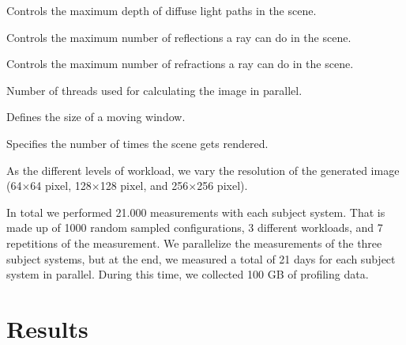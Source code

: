 
\begin{description}[style=multiline,leftmargin=11em]
	\item [DiffuseDepth] Controls the maximum depth of diffuse light paths in the scene. 
	\item [ReflectionDepth] Controls the maximum number of reflections a ray can do in the scene.
	\item [RefractionDepth] Controls the maximum number of refractions a ray can do in the scene.
	\item [Threads] Number of threads used for calculating the image in parallel.
	\item [BucketSize] Defines the size of a moving window.
	\item [Samples] Specifies the number of times the scene gets rendered.
\end{description}

As the different levels of workload, we vary the resolution of the generated image (64$\times$64 pixel, 128$\times$128 pixel, and 256$\times$256 pixel).


In total we performed 21.000 measurements with each subject system. That is made up of 1000 random sampled configurations, 3 different workloads, and 7 repetitions of the measurement. We parallelize the measurements of the three subject systems, but at the end, we measured a total of 21 days for each subject system in parallel. During this time, we collected 100 GB of profiling data. 


\section{Results}
\label{results}




